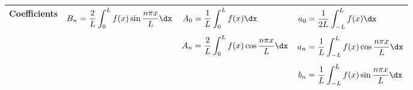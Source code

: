 \begin{table}[H]
\begin{tabular}{@{}l|c|c|c@{}}
\midrule
Coefficients
& $B_n = \dfrac{2}{L}\displaystyle\int_0^L f(x)\sin\frac{n\pi x}{L}\dx$
& $\begin{aligned}A_0 &= \dfrac{1}{L}\displaystyle\int_0^L f(x)\dx \\[4pt] A_n &= \dfrac{2}{L}\displaystyle\int_0^L f(x)\cos\frac{n\pi x}{L}\dx\end{aligned}$
& $\begin{aligned}a_0 &= \dfrac{1}{2L}\displaystyle\int_{-L}^{L} f(x)\dx \\[4pt] a_n &= \dfrac{1}{L}\displaystyle\int_{-L}^{L} f(x)\cos\frac{n\pi x}{L}\dx \\[4pt] b_n &= \dfrac{1}{L}\displaystyle\int_{-L}^{L} f(x)\sin\frac{n\pi x}{L}\dx\end{aligned}$ \\
\bottomrule
\end{tabular}
\end{table}

